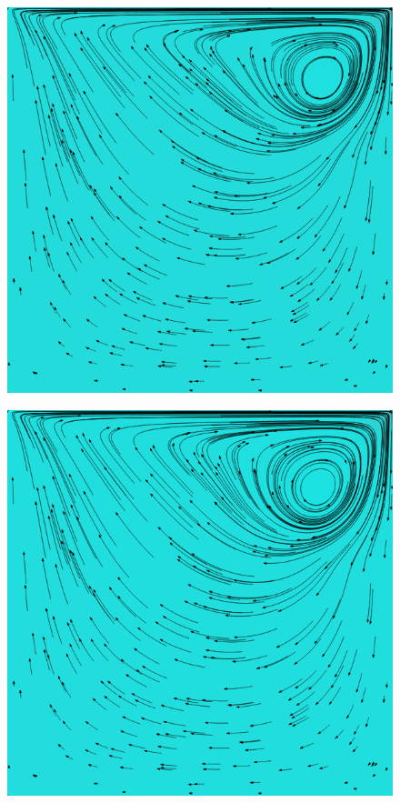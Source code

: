 		\begin{frame}
			\begin{figure}
				\centering
				\includegraphics[scale=0.4]{images/re-1000-512-02170.png}
			\end{figure}
		\end{frame}

		\begin{frame}
			\begin{figure}
				\centering
				\includegraphics[scale=0.4]{images/re-1000-512-02405.png}
			\end{figure}
		\end{frame}

